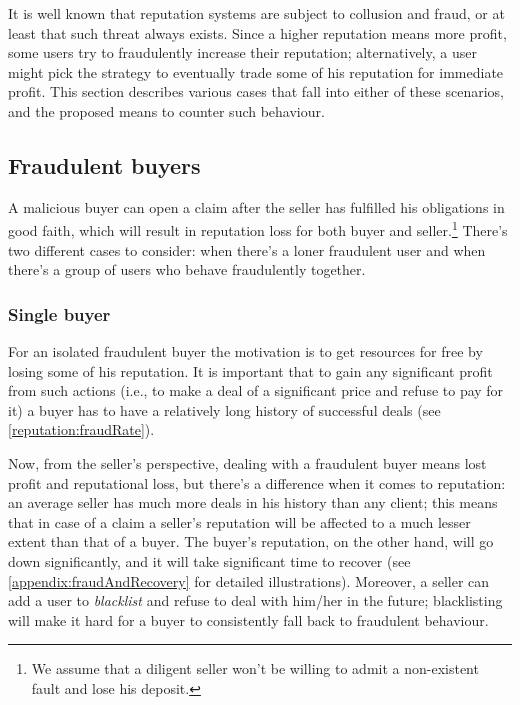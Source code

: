 \documentclass[11pt]{article}
\begin{document}
It is well known \cite{ciccarelli2011collusion, maranzato2010fraud} that reputation systems are subject to collusion and fraud, or at least that such threat always exists. Since a higher reputation means more profit, some users try to fraudulently increase their reputation; alternatively, a user might 
pick the strategy to eventually trade some of his reputation for immediate profit. This section describes various cases that fall into either of these scenarios, and the proposed means to counter such behaviour.

\subsection{Fraudulent buyers} \label{threatModel:buyers}

A malicious buyer can open a claim after the seller has fulfilled his obligations in good faith, which will result in reputation loss for both buyer and seller.\footnote{We assume that a diligent seller won't be willing to admit a non-existent fault and lose his deposit.} There's two different cases to consider: when there's a loner fraudulent user and when there's a group of users who behave fraudulently together.

\subsubsection{Single buyer} \label{threatModel:buyers:single}

For an isolated fraudulent buyer the motivation is to get resources for free by losing some of his reputation. It is important that to gain any significant profit from such actions (i.e., to make a deal of a significant price and refuse to pay for it) a buyer has to have a relatively long history of successful deals (see \ref{reputation:fraudRate}).


Now, from the seller's perspective, dealing with a fraudulent buyer means lost profit and reputational loss, but there's a difference when it comes to reputation: an average seller has much more deals in his history than any client; this means that in case of a claim a seller's reputation will be affected to a much lesser extent than that of a buyer. The buyer's reputation, on the other hand, will go down significantly, and it will take significant time to recover (see \ref{appendix:fraudAndRecovery} for detailed illustrations). Moreover, a seller can add a user to \textit{blacklist} and refuse to deal with him/her in the future; blacklisting will make it hard for a buyer to consistently fall back to fraudulent behaviour. 
\end{document}
